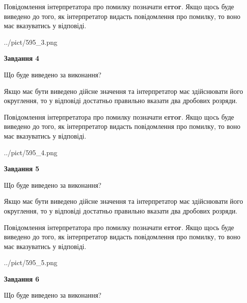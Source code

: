 \documentclass[12pt, ukrainian]{article}
\begin{document}
{\begin {Large}
Повідомлення інтерпретатора про помилку позначати \textbf{error}.
Якщо щось буде виведено до того, як інтерпретатор видасть повідомлення про помилку, 
то воно має вказуватись у відповіді. \par

\begin{center}
	{../pict/595_3.png}
\end{center}
\newpage

{\begin {center}\textbf{Завдання 4}\end {center}}\par
Що буде виведено за виконання? \par

Якщо має бути виведено дійсне значення та інтерпретатор має здійснювати його округлення, 
то у відповіді достатньо правильно вказати два дробових розряди.

Повідомлення інтерпретатора про помилку позначати \textbf{error}.
Якщо щось буде виведено до того, як інтерпретатор видасть повідомлення про помилку, 
то воно має вказуватись у відповіді. \par

\begin{center}
	{../pict/595_4.png}
\end{center}
\newpage

{\begin {center}\textbf{Завдання 5}\end {center}}\par
Що буде виведено за виконання? \par

Якщо має бути виведено дійсне значення та інтерпретатор має здійснювати його округлення, 
то у відповіді достатньо правильно вказати два дробових розряди.

Повідомлення інтерпретатора про помилку позначати \textbf{error}.
Якщо щось буде виведено до того, як інтерпретатор видасть повідомлення про помилку, 
то воно має вказуватись у відповіді. \par

\begin{center}
	{../pict/595_5.png}
\end{center}
\newpage

{\begin {center}\textbf{Завдання 6}\end {center}}\par
Що буде виведено за виконання? \par


\end{Large}}
\end{document}
